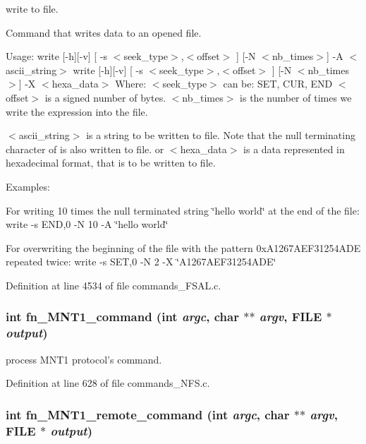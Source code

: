write to file.

Command that writes data to an opened file.

Usage: write [-h][-v] [ -s $<$seek\_\-type$>$,$<$offset$>$ ] [-N $<$nb\_\-times$>$] -A $<$ascii\_\-string$>$ write [-h][-v] [ -s $<$seek\_\-type$>$,$<$offset$>$ ] [-N $<$nb\_\-times$>$] -X $<$hexa\_\-data$>$ Where: $<$seek\_\-type$>$ can be: SET, CUR, END $<$offset$>$ is a signed number of bytes. $<$nb\_\-times$>$ is the number of times we write the expression into the file.

$<$ascii\_\-string$>$ is a string to be written to file. Note that the null terminating character of is also written to file. or $<$hexa\_\-data$>$ is a data represented in hexadecimal format, that is to be written to file.

Examples:

For writing 10 times the null terminated string \char`\"{}hello world\char`\"{} at the end of the file: write -s END,0 -N 10 -A \char`\"{}hello world\char`\"{}

For overwriting the beginning of the file with the pattern 0xA1267AEF31254ADE repeated twice: write -s SET,0 -N 2 -X \char`\"{}A1267AEF31254ADE\char`\"{} 

Definition at line 4534 of file commands\_\-FSAL.c.
\subsubsection[{fn\_\-MNT1\_\-command}]{\setlength{\rightskip}{0pt plus 5cm}int fn\_\-MNT1\_\-command (int {\em argc}, \/  char $\ast$$\ast$ {\em argv}, \/  FILE $\ast$ {\em output})}\label{commands_8h_d9e57b227010916f9c9168a00b14c1ed}


process MNT1 protocol's command. 

Definition at line 628 of file commands\_\-NFS.c.
\subsubsection[{fn\_\-MNT1\_\-remote\_\-command}]{\setlength{\rightskip}{0pt plus 5cm}int fn\_\-MNT1\_\-remote\_\-command (int {\em argc}, \/  char $\ast$$\ast$ {\em argv}, \/  FILE $\ast$ {\em output})}\label{commands_8h_1677ca6949081f0d97593268114459a1}


